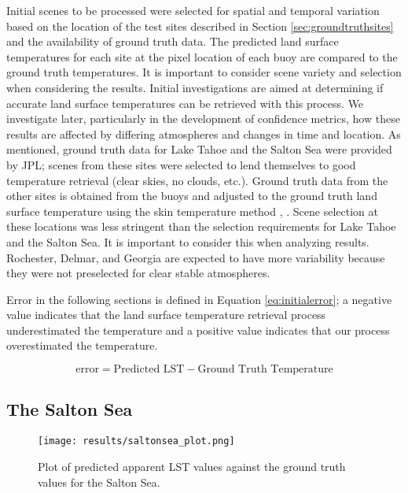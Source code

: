\documentclass{book}
\begin{document}
Initial scenes to be processed were selected for spatial and temporal variation based on the location of the test sites described in Section \ref{sec:groundtruthsites} and the availability of ground truth data.  The predicted land surface temperatures for each site at the pixel location of each buoy are compared to the ground truth temperatures.  It is important to consider scene variety and selection when considering the results.  Initial investigations are aimed at determining if accurate land surface temperatures can be retrieved with this process.  We investigate later, particularly in the development of confidence metrics, how these results are affected by differing atmospheres and changes in time and location.  As mentioned, ground truth data for Lake Tahoe and the Salton Sea were provided by JPL; scenes from these sites were selected to lend themselves to good temperature retrieval (clear skies, no clouds, etc.).  Ground truth data from the other sites is obtained from the buoys and adjusted to the ground truth land surface temperature using the skin temperature method \cite{schott_2012}, \cite{schott_2010}.  Scene selection at these locations was less stringent than the selection requirements for Lake Tahoe and the Salton Sea.  It is important to consider this when analyzing results.  Rochester, Delmar, and Georgia are expected to have more variability because they were not preselected for clear stable atmospheres.

Error in the following sections is defined in Equation \ref{eq:initialerror}; a negative value indicates that the land surface temperature retrieval process underestimated the temperature and a positive value indicates that our process overestimated the temperature.

\begin{equation}
\mbox{error} = \mbox{Predicted LST} - \mbox{Ground Truth Temperature}
\label{eq:initialerror}
\end{equation}

\subsection{The Salton Sea}

\begin{figure}[H]
\centering
\texttt{[image: results/saltonsea\_plot.png]}
\caption{Plot of predicted apparent LST values against the ground truth values for the Salton Sea.}
\label{fig:saltonsea_plot}
\end{figure}
\end{document}
